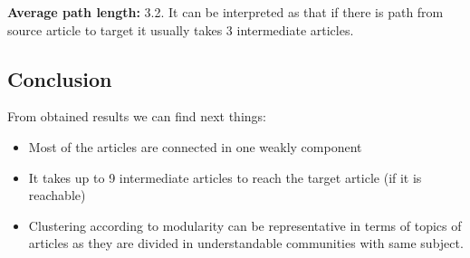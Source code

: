 \textbf{Average path length:} 3.2. It can be interpreted as that if there is path from source article to target it usually takes 3 intermediate articles.

\subsection*{Conclusion}

From obtained results we can find next things:
\begin{itemize}
    \item Most of the articles are connected in one weakly component
    \item It takes up to 9 intermediate articles to reach the target article (if it is reachable)
    \item Clustering according to modularity can be representative in terms of topics of articles as they are divided in understandable communities with same subject.
\end{itemize}